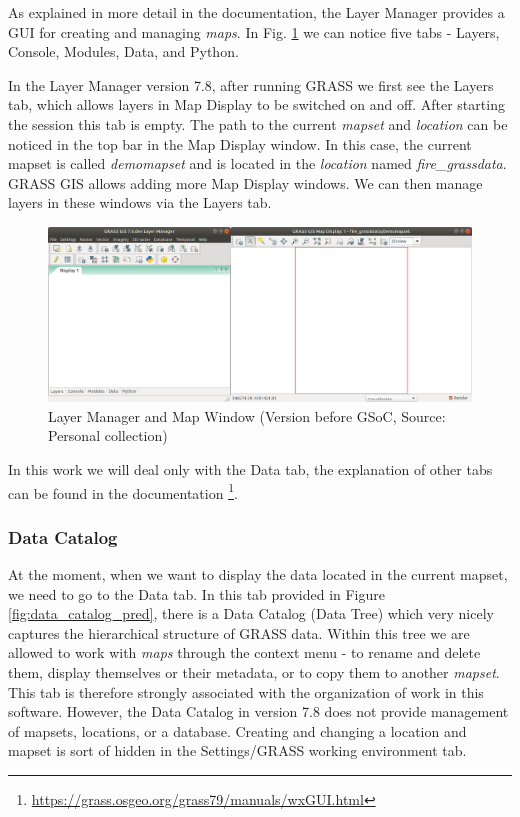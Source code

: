 \documentclass[a4paper,10pt,twoside]{article}
\begin{document}
As explained in more detail in the documentation, the Layer Manager provides a GUI for creating and managing \textit{maps}. In Fig. \ref{fig:empty_layers1} we can notice five tabs - Layers, Console, Modules, Data, and Python.

In the Layer Manager version 7.8, after running GRASS we first see the Layers tab, which allows layers in Map Display to be switched on and off. After starting the session this tab is empty. The path to the current \textit{mapset} and \textit{location} can be noticed in the top bar in the Map Display window. In this case, the current mapset is called \textit{demomapset} and is located in the \textit{location} named \textit{fire\_grassdata}. GRASS GIS allows adding more Map Display windows. We can then manage layers in these windows via the Layers tab.

\vspace{0.3cm}
\begin{figure}[hbt!] 
\begin{center}
\includegraphics[width=17cm]{../pictures/empty_layers1.png} 
\caption[Layer Manager and Map Window (Version before GSoC)]{Layer Manager and Map Window  (Version before GSoC, Source: Personal collection)}
\label{fig:empty_layers1}
\end{center}
\end{figure}

\noindent In this work we will deal only with the Data tab, the explanation of other tabs can be found in the documentation \footnote{\url{https://grass.osgeo.org/grass79/manuals/wxGUI.html}}.
 
\newpage
\vspace*{-1cm}
\subsubsection{Data Catalog}

At the moment, when we want to display the data located in the current mapset, we need to go to the Data tab. In this tab provided in Figure \ref{fig:data_catalog_pred}, there is a Data Catalog (Data Tree) which very nicely captures the hierarchical structure of GRASS data. Within this tree we are allowed to work with \textit{maps} through the context menu - to rename and delete them, display themselves or their metadata, or to copy them to another \textit{mapset}. This tab is therefore strongly associated with the organization of work in this software. However, the Data Catalog in version 7.8 does not provide management of mapsets, locations, or a database. Creating and changing a location and mapset is sort of hidden in the Settings/GRASS working environment tab.
\end{document}
